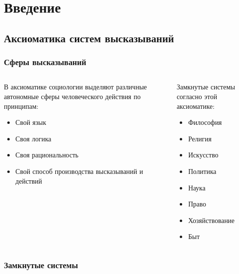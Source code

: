 \section{Введение}
\subsection{Аксиоматика систем высказываний}
\begin{frame}
    \frametitle{Сферы высказываний}
    \begin{columns}
        \begin{column}{0.5\textwidth}
            В аксиоматике социологии выделяют различные автономные сферы
            человеческого действия по принципам:
            \begin{itemize}[<+->]
                \item Свой язык
                \item Своя логика
                \item Своя рациональность
                \item Свой способ производства высказываний и действий
            \end{itemize}
        \end{column}
        \begin{column}{0.5\textwidth}
            Замкнутые системы согласно этой аксиоматике:
            \begin{itemize}[<+->]
                \item Философия
                \item Религия
                \item Искусство
                \item Политика
                \item Наука
                \item Право
                \item Хозяйствование
                \item Быт
            \end{itemize}
        \end{column}
    \end{columns}
\end{frame}

\begin{frame}
    \frametitle{Замкнутые системы}
    \par\vspace{0.3cm}
\end{frame}


